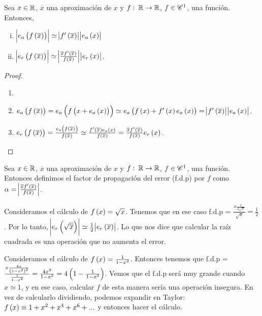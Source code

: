 \begin{prop}
  Sea $x \in \mathbb{R}$, $\overline{x}$ una aproximación de $x$ y $f:\: \mathbb{R} \to \mathbb{R}$, $f\in \mathscr{C}^1$, una función. Entonces,
  \begin{enumerate}[i)]
   \item $\abs{e_a\left( f\left(\overline{x}\right)\right)} \simeq \abs{f'\left( \overline{x}\right)}\abs{e_a\left( x\right)}$
   \item $\abs{e_r\left( f\left(\overline{x}\right)\right)} \simeq \abs{\frac{\overline{x}f'\left(\overline{x}\right)}{f\left(\overline{x}\right)}}\abs{e_r\left( x\right)}$.
  \end{enumerate}
\end{prop}
\begin{proof}
  \begin{enumerate}
   \item []
   \item 
      $e_a\left( f\left( \overline{x}\right)\right)  = e_a\left( f\left( x + e_a\left( x\right) \right)\right) \simeq e_a\left( f\left( x\right)  + f'\left( x\right) e_a\left( x\right)\right) = \abs{f'\left( \overline{x}\right)}\abs{e_a\left( x\right)}$.
   \item 
      $e_r\left( f\left( \overline{x}\right) \right)  = \frac{e_a\left( f\left( \overline{x}\right) \right) }{f\left( \overline{x}\right) } \simeq \frac{f'\left( \overline{x}\right) e_a\left( x\right) }{f\left( \overline{x}\right) } = \frac{\overline{x}f'\left( \overline{x}\right) }{f\left( \overline{x}\right) }e_r\left( x\right)$.
  \end{enumerate}
\end{proof}

\begin{defi}
   Sea $x \in \mathbb{R}$, $\overline{x}$ una aproximación de $x$ y $f:\: \mathbb{R} \to \mathbb{R}$, $f\in \mathscr{C}^1$, una función. Entonces definimos el factor de propagación del error (f.d.p) por $f$ como $\alpha = \abs{\frac{\overline{x}f'\left(\overline{x}\right)}{f\left(\overline{x}\right)}}$.
\end{defi}

\begin{example}
      Consideramos el cálculo de $f\left( x\right)  = \sqrt{x}$. Tenemos que en ese caso f.d.p = $\frac{x\frac{1}{2\sqrt{x}}}{\sqrt{x}} = \frac{1}{2}$. Por lo tanto,  $\abs{e_r\left( \sqrt{\overline{x}}\right)} \simeq \frac{1}{2}\abs{e_r\left( \overline{x}\right)}$. Lo que nos dice que calcular la raíz cuadrada es una operación que no aumenta el error.
\end{example}

\begin{example}
      Consideramos el cálculo de $f\left( x\right)  = \frac{1}{1-x^2}$. Entonces tenemos que f.d.p = $\frac{x\frac{4x}{\left( 1-x^2\right) ^2}}{\frac{1}{1-x^2}} = \frac{4x^2}{1-x^2} = 4\left( 1 - \frac{1}{1-x^2}\right) $. Vemos que el f.d.p será muy grande cuando $x \simeq 1$, y en ese caso, calcular $f$ de esta manera sería una operación insegura. En vez de calcularlo dividiendo, podemos expandir en Taylor: $f\left( x\right)  \equiv 1 + x^2 + x^4 + x^6 + ...$ y entonces hacer el cálculo.
\end{example}

